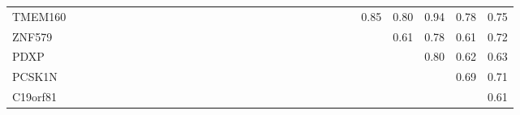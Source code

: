 \begin{longtable}{lrrrrrrrrrrrrrrrrrrrrrrrrrrrrrr}
TMEM160       &                    &               &            &             &              &               &               &               &             &               &              &             &              &             &             &             &                &                &               &               &                     &             &                &            &               &         0.85 &       0.80 &         0.94 &           0.78 &          0.75 \\
ZNF579        &                    &               &            &             &              &               &               &               &             &               &              &             &              &             &             &             &                &                &               &               &                     &             &                &            &               &              &       0.61 &         0.78 &           0.61 &          0.72 \\
PDXP          &                    &               &            &             &              &               &               &               &             &               &              &             &              &             &             &             &                &                &               &               &                     &             &                &            &               &              &            &         0.80 &           0.62 &          0.63 \\
PCSK1N        &                    &               &            &             &              &               &               &               &             &               &              &             &              &             &             &             &                &                &               &               &                     &             &                &            &               &              &            &              &           0.69 &          0.71 \\
C19orf81      &                    &               &            &             &              &               &               &               &             &               &              &             &              &             &             &             &                &                &               &               &                     &             &                &            &               &              &            &              &                &          0.61 \\
\end{longtable}


